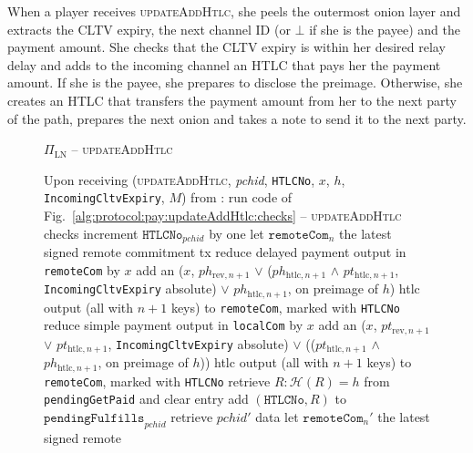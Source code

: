   When a player receives \textsc{updateAddHtlc}, she peels the outermost onion
  layer and extracts the CLTV expiry, the next channel ID (or $\bot$ if she is
  the payee) and the payment amount. She checks that the CLTV expiry is within
  her desired relay delay and adds to the incoming channel an HTLC that pays her
  the payment amount. If she is the payee, she prepares to disclose the
  preimage. Otherwise, she creates an HTLC that transfers the payment amount
  from her to the next party of the path, prepares the next onion and takes a
  note to send it to the next party.

  \begin{figure}[H]
    \begin{protocolbox}{$\Pi_{\mathrm{LN}}$ -- \textsc{updateAddHtlc}}
      \begin{algorithmic}[1]
        \State Upon receiving (\textsc{updateAddHtlc}, \textit{pchid},
        \texttt{HTLCNo}, $x$, $h$, \texttt{IncomingCltvExpiry}, $M$) from \bob:
        \Indent
          \State run code of Fig.~\ref{alg:protocol:pay:updateAddHtlc:checks} --
          \textsc{updateAddHtlc} checks
          \State increment $\mathtt{HTLCNo}_{\mathit{pchid}}$ by one
          \State let $\mathtt{remoteCom}_n$ the latest signed remote commitment
          tx
          \State reduce delayed payment output in \texttt{remoteCom} by $x$
          \State add an ($x$, $ph_{\mathrm{rev}, n+1}$ $\vee$
          ($ph_{\mathrm{htlc}, n+1}$ $\wedge$ $pt_{\mathrm{htlc}, n+1}$,
          \texttt{IncomingCltvExpiry} absolute) $\vee$ $ph_{\mathrm{htlc},
          n+1}$, on preimage of $h$) htlc output (all with $n+1$ keys) to
          \texttt{remoteCom}, marked with \texttt{HTLCNo}
          \State reduce simple payment output in \texttt{localCom} by $x$
          \State add an ($x$, $pt_{\mathrm{rev}, n+1}$ $\vee$
          $pt_{\mathrm{htlc}, n+1}$, \texttt{IncomingCltvExpiry} absolute)
          $\vee$ (($pt_{\mathrm{htlc}, n+1}$ $\wedge$ $ph_{\mathrm{htlc}, n+1}$,
          on preimage of $h$)) htlc output (all with $n+1$ keys) to
          \texttt{remoteCom}, marked with \texttt{HTLCNo}
            \State retrieve $R : \mathcal{H}\left(R\right) = h$ from
            \texttt{pendingGetPaid} and clear entry
            \State add $\left(\mathtt{HTLCNo}, R\right)$ to
            $\mathtt{pendingFulfills}_{\mathit{pchid}}$
           
            \State retrieve $\mathit{pchid}'$ data
            \State let $\mathtt{remoteCom}_n'$ the latest signed remote

\end{algorithmic}
\end{protocolbox}
\end{figure}
